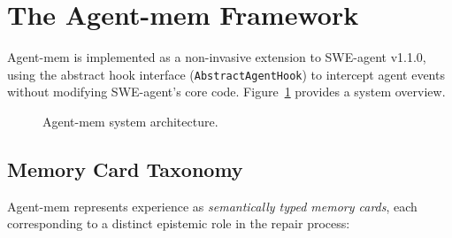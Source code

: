 \documentclass{article}
\begin{document}
\section{The Agent-mem Framework}

Agent-mem is implemented as a non-invasive extension to SWE-agent v1.1.0, using the abstract hook interface (\texttt{AbstractAgentHook}) to intercept agent events without modifying SWE-agent's core code. Figure~\ref{fig:architecture} provides a system overview.

\begin{figure}[h]
\centering
\caption{Agent-mem system architecture.}
\label{fig:architecture}
\end{figure}

\subsection{Memory Card Taxonomy}

Agent-mem represents experience as \emph{semantically typed memory cards}, each corresponding to a distinct epistemic role in the repair process:
\end{document}
